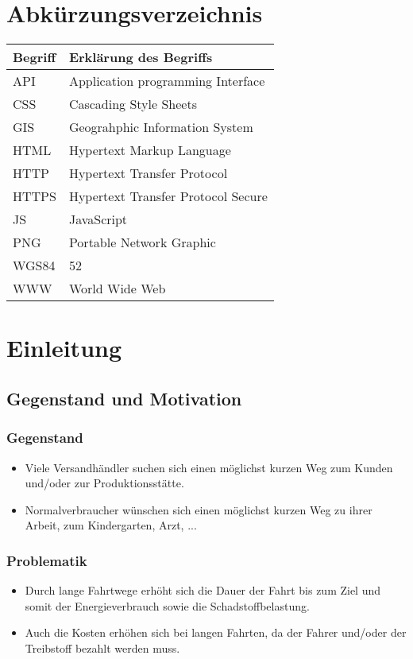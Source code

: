 \documentclass[a4paper, twoside, 12pt]{scrreprt}
\begin{document}
\chapter*{Abkürzungsverzeichnis}
\begin{tabularx}{\textwidth}{lX}
\toprule
\textrm{Begriff}                &\textrm{Erklärung des Begriffs}\\
\midrule
API		&Application programming Interface\\
CSS		&Cascading Style Sheets\\
GIS		&Geograhphic Information System \\
HTML	&Hypertext Markup Language\\
HTTP	&Hypertext Transfer Protocol\\
HTTPS	&Hypertext Transfer Protocol Secure\\
JS		&JavaScript\\
PNG		&Portable Network Graphic\\
WGS84	&52\\
WWW		&World Wide Web\\

\bottomrule
\end{tabularx}

\chapter {Einleitung}
\section{Gegenstand und Motivation}
\subsection{Gegenstand}
\begin{itemize}
\item Viele Versandhändler suchen sich einen möglichst kurzen Weg zum Kunden und/oder zur Produktionsstätte.
\item Normalverbraucher wünschen sich einen möglichst kurzen Weg zu ihrer Arbeit, zum Kindergarten, Arzt, ...
\end{itemize}
\subsection{Problematik}
\begin{itemize}
\item Durch lange Fahrtwege erhöht sich die Dauer der Fahrt bis zum Ziel und somit der Energieverbrauch sowie die Schadstoffbelastung.
\item Auch die Kosten erhöhen sich bei langen Fahrten, da der Fahrer und/oder der Treibstoff bezahlt werden muss.
\end{itemize}
\end{document}
